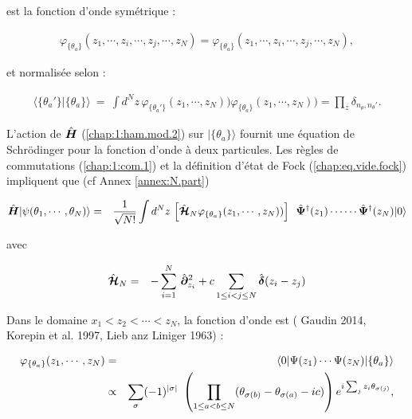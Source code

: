 est la fonction d’onde symétrique :

\begin{eqnarray}
	\varphi_{\{\theta_a\}}(z_1, \cdots ,z_i , \cdots , z_j,  \cdots ,  z_N) = \varphi_{\{\theta_a\}}(z_1, \cdots ,z_i , \cdots , z_j,  \cdots ,  z_N),
\end{eqnarray}

et normalisée selon :

\begin{eqnarray}
	\langle \{\theta_a'\} \vert \{\theta_a^{}\} \rangle ~=~ \int d^Nz\,\varphi_{\{\theta_a'\}}(z_1, \cdots ,  z_N))  \varphi_{\{\theta_a^{}\}}(z_1, \cdots ,  z_N)) = \prod_z\delta_{n_\theta^{},n_\theta'}.
\end{eqnarray}

L’action de \(\hat{\bm{H}}\) (\ref{chap:1:ham.mod.2}) sur \(\vert \{\theta_a\} \rangle\) fournit une équation de Schrödinger pour la fonction d’onde à deux particules. Les règles de commutations (\ref{chap:1:com.1}) et la définition d'état de Fock (\ref{chap:eq.vide.fock}) impliquent que (cf Annex \ref{annex:N.part})

%



\begin{eqnarray}
	\operator{H}\vert \psi ( \theta_1 , \cdots , \theta_N ) \rangle &= &  \frac{1}{ \sqrt{N!}} \int d^N z \,  	\left [ \operator{\mathcal{H}}_N \varphi_{\{\theta_a\}}(z_1, \cdots ,  z_N)) \right ] \, \operator{\Psi}^\dag(z_1) \cdots  \cdots\operator{\Psi}^\dag(z_N) \vert 0 \rangle		
\end{eqnarray}

avec 

\begin{eqnarray}
	\hat{\bm{\mathcal{H}}}_N & = &  - \sum_{i=1}^N \, \hat{\bm{\partial}}_{z_i}^2 + 	c \sum_{1\leq i<j\leq N} \hat{\bm{\delta}}(z_i - z_j) 		
\end{eqnarray}


Dans le domaine $x_1 < z_2 < \cdots < z_N$, la fonction d'onde est ({\color{blue} Gaudin 2014}, {\color{blue}Korepin et al. 1997}, {\color{blue}Lieb anz Liniger 1963}) :

\begin{eqnarray}
	\varphi_{\{\theta_a\}} ( z_1 , \cdots , z_N ) & = & \langle 0 \vert \Psi ( z_1 ) \cdots \Psi (z_N ) \vert \{ \theta_a \} \rangle \notag\\
	& \propto & \sum_\sigma ( - 1 ) ^{ \vert \sigma \vert } \left ( \prod_{ 1 \leq a < b \leq N } ( \theta_{\sigma(b)} - \theta_{\sigma(a)} - ic ) \right ) e^{i \sum_j z_i \theta_{ \sigma(j)}}\label{eq:I-2-17},
\end{eqnarray}

